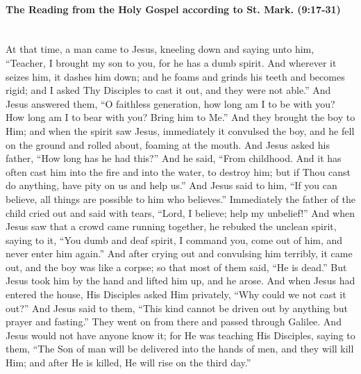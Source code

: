 \documentclass[twoside, letterpaper, 12pt]{report}
\begin{document}


\paragraph{The Reading from the Holy Gospel according to St. Mark. (9:17-31)}\mbox{}\\

At that time, a man came to Jesus, kneeling down and saying unto him, “Teacher, I brought
my son to you, for he has a dumb spirit. And wherever it seizes him, it dashes him down; and he
foams and grinds his teeth and becomes rigid; and I asked Thy Disciples to cast it out, and they
were not able.” And Jesus answered them, “O faithless generation, how long am I to be with you?
How long am I to bear with you? Bring him to Me.” And they brought the boy to Him; and when
the spirit saw Jesus, immediately it convulsed the boy, and he fell on the ground and rolled about,
foaming at the mouth. And Jesus asked his father, “How long has he had this?” And he said, “From
childhood. And it has often cast him into the fire and into the water, to destroy him; but if Thou
canst do anything, have pity on us and help us.” And Jesus said to him, “If you can believe, all
things are possible to him who believes.” Immediately the father of the child cried out and said
with tears, “Lord, I believe; help my unbelief!” And when Jesus saw that a crowd came running
together, he rebuked the unclean spirit, saying to it, “You dumb and deaf spirit, I command you,
come out of him, and never enter him again.” And after crying out and convulsing him terribly, it
came out, and the boy was like a corpse; so that most of them said, “He is dead.” But Jesus took
him by the hand and lifted him up, and he arose. And when Jesus had entered the house, His
Disciples asked Him privately, “Why could we not cast it out?” And Jesus said to them, “This kind
cannot be driven out by anything but prayer and fasting.” They went on from there and passed
through Galilee. And Jesus would not have anyone know it; for He was teaching His Disciples,
saying to them, “The Son of man will be delivered into the hands of men, and they will kill Him;
and after He is killed, He will rise on the third day.”
\end{document}
